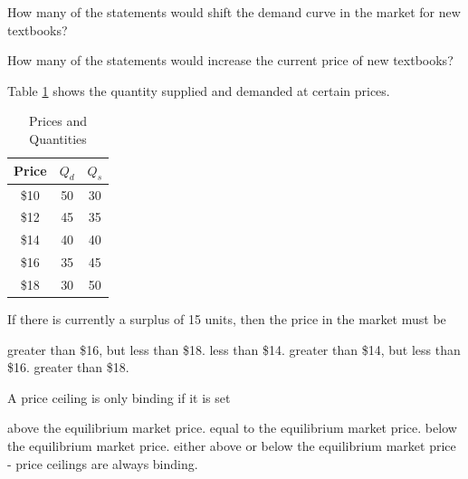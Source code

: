 \documentclass[addpoints,11pt]{exam}
\theoremstyle{definition}
\begin{document}
\begin{questions}
\newpage

\question \label{qq1} How many of the statements would shift the demand curve in the market for new textbooks?

\begin{choices}
\end{choices}

\question \label{qq2} How many of the statements would increase the current price of new textbooks?

\begin{choices}
\end{choices}

\question Table \ref{MC17} shows the quantity supplied and demanded at certain prices.


\begin{table}[H]
	\caption{Prices and Quantities}
	\centering
	\begin{tabular}{  c | c | c} 
		
		Price & $Q_d$ & $Q_s$ \\
		\hline
		\$10 & 50 & 30 \\
		\$12 & 45 & 35 \\
		\$14 & 40 & 40 \\
		\$16 & 35 & 45 \\
		\$18 & 30 & 50 \\
	\end{tabular}
	\label{MC17}
\end{table}

If there is currently a surplus of 15 units, then the price in the market must be

\begin{choices}
	\CorrectChoice greater than \$16, but less than \$18.
	\choice less than \$14.
	\choice greater than \$14, but less than \$16.
	\choice greater than \$18.
\end{choices}



\question A price ceiling is only binding if it is set

\begin{choices}
	\choice above the equilibrium market price.
	\choice equal to the equilibrium market price.
	\CorrectChoice below the equilibrium market price.
	\choice either above or below the equilibrium market price - price ceilings are always binding.
\end{choices} 


\end{questions}
\end{document}
